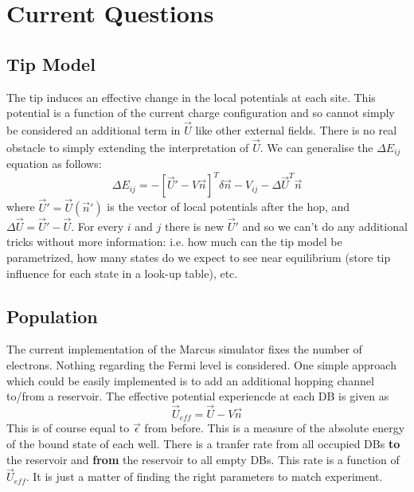 \documentclass[11pt]{article}
\begin{document}
\section{Current Questions}

\subsection{Tip Model}

The tip induces an effective change in the local potentials at each site. This potential is a function of the current charge configuration and so cannot simply be considered an additional term in $\vec{U}$ like other external fields. There is no real obstacle to simply extending the interpretation of $\vec{U}$. We can generalise the $\Delta E_{ij}$ equation as follows:
\begin{equation}
\Delta E_{ij} = -[\vec{U}' -V\vec{n}]^T \delta \vec{n} - V_{ij} - \Delta \vec{U}^T \vec{n}
\end{equation}
where $\vec{U}' = \vec{U}(\vec{n}')$ is the vector of local potentials after the hop, and $\Delta \vec{U} = \vec{U}' - \vec{U}$. For every $i$ and $j$ there is new $\vec{U}'$ and so we can't do any additional tricks without more information: i.e. how much can the tip model be parametrized, how many states do we expect to see near equilibrium (store tip influence for each state in a look-up table), etc.

\subsection{Population}

The current implementation of the Marcus simulator fixes the number of electrons. Nothing regarding the Fermi level is considered. One simple approach which could be easily implemented is to add an additional hopping channel to/from a reservoir. The effective potential experiencde at each DB is given as
\begin{equation}
\vec{U}_{eff} = \vec{U} - V \vec{n}
\end{equation}
This is of course equal to $\vec{\epsilon}$ from before. This is a measure of the absolute energy of the bound state of each well. There is a tranfer rate from all occupied DBs \textbf{to} the reservoir and \textbf{from} the reservoir to all empty DBs. This rate is a function of $\vec{U}_{eff}$. It is just a matter of finding the right parameters to match experiment.
\end{document}

